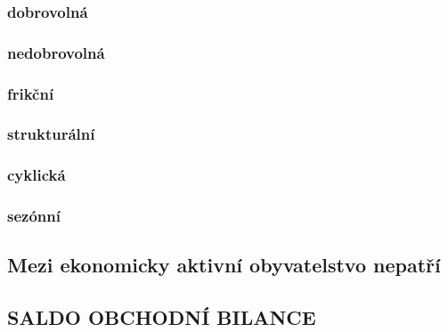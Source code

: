 \documentclass[ekobook.tex]{subfiles}
\begin{document}
\subsubsection{dobrovolná}
\subsubsection{nedobrovolná}
\subsubsection{frikční}
\subsubsection{strukturální}
\subsubsection{cyklická}
\subsubsection{sezónní}
\subsection{Mezi ekonomicky aktivní obyvatelstvo nepatří}
\subsection{SALDO OBCHODNÍ BILANCE}
\newpage
\end{document}
